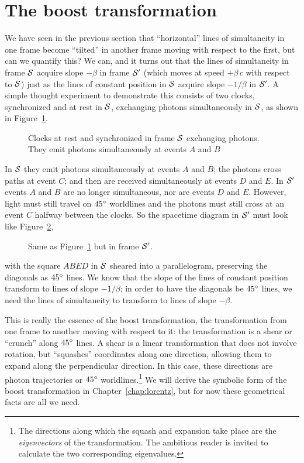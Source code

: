 \section{The boost transformation}
\label{sec:boosttx}

We have seen in the previous section that ``horizontal'' lines of
simultaneity in one frame become ``tilted'' in another frame moving
with respect to the first, but can we quantify this?  We can, and it
turns out that the lines of simultaneity in frame $\cal S$ acquire
slope $-\beta$ in frame $\cal S'$ (which moves at speed $+\beta\, c$
with respect to $\cal S$) just as the lines of constant position in
$\cal S$ acquire slope $-1/\beta$ in $\cal S'$.  A simple thought
experiment to demonstrate this consists of two clocks, synchronized
and at rest in $\cal S$, exchanging photons simultaneously in
$\cal S$, as shown in Figure~\ref{fig:slope}.
\begin{figure}
\caption[Clocks exchanging photons in their rest frame.]{Clocks at
rest and synchronized in frame $\cal S$ exchanging photons.  They
emit photons simultaneously at events $A$ and $B$}
\label{fig:slope}
\end{figure}
In $\cal S$ they emit photons simultaneously at events $A$ and $B$;
the photons cross paths at event $C$; and then are received
simultaneously at events $D$ and $E$.  In $\cal S'$ events $A$ and
$B$ are no longer simultaneous, nor are events $D$ and $E$.  However,
light must still travel on $45^{\circ}$ worldlines and the photons must
still cross at an event $C$ halfway between the clocks.  So the
spacetime diagram in $\cal S'$ must look like
Figure~\ref{fig:slope2},
\begin{figure}
\caption[Clocks exchanging photons in another frame.]{Same as
Figure~\ref{fig:slope} but in frame $\cal S'$.}
\label{fig:slope2}
\end{figure}
with the square $ABED$ in $\cal S$ sheared into a parallelogram,
preserving the diagonals as $45^{\circ}$ lines.  We know that the slope
of the lines of constant position transform to lines of slope
$-1/\beta$; in order to have the diagonals be $45^{\circ}$ lines, we
need the lines of simultaneity to transform to lines of slope
$-\beta$.

This is really the essence of the boost transformation, the
transformation from one frame to another moving with respect to it:
the transformation is a shear or ``crunch'' along $45^{\circ}$ lines.
A shear is a linear transformation that does not involve rotation, but
``squashes'' coordinates along one direction, allowing them to expand
along the perpendicular direction.  In this case, these directions are
photon trajectories or $45^{\circ}$ worldlines.\footnote{The directions
along which the squash and expansion take place are the {\em
eigenvectors\/} of the transformation.  The ambitious reader is
invited to calculate the two corresponding eigenvalues.}  We will
derive the symbolic form of the boost transformation in
Chapter~\ref{chap:lorentz}, but for now these geometrical facts are
all we need.

